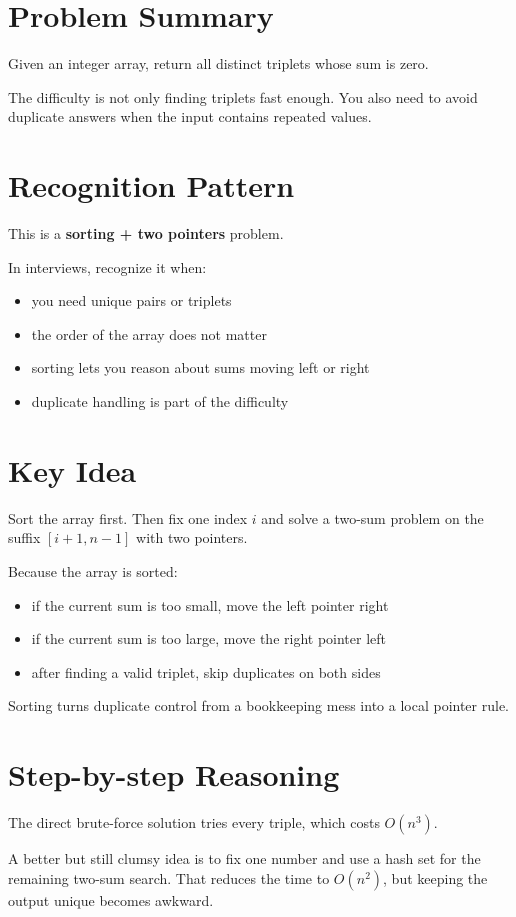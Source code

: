 \section{Problem Summary}
Given an integer array, return all distinct triplets whose sum is zero.

The difficulty is not only finding triplets fast enough. You also need to avoid duplicate answers when the input contains repeated values.

\section{Recognition Pattern}
This is a \textbf{sorting + two pointers} problem.

In interviews, recognize it when:
\begin{itemize}
\item you need unique pairs or triplets
\item the order of the array does not matter
\item sorting lets you reason about sums moving left or right
\item duplicate handling is part of the difficulty
\end{itemize}

\section{Key Idea}
Sort the array first. Then fix one index \(i\) and solve a two-sum problem on the suffix \([i + 1, n - 1]\) with two pointers.

Because the array is sorted:
\begin{itemize}
\item if the current sum is too small, move the left pointer right
\item if the current sum is too large, move the right pointer left
\item after finding a valid triplet, skip duplicates on both sides
\end{itemize}

Sorting turns duplicate control from a bookkeeping mess into a local pointer rule.

\section{Step-by-step Reasoning}
The direct brute-force solution tries every triple, which costs \(O(n^3)\).

A better but still clumsy idea is to fix one number and use a hash set for the remaining two-sum search. That reduces the time to \(O(n^2)\), but keeping the output unique becomes awkward.

